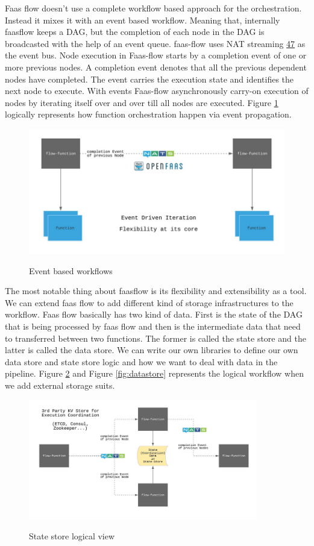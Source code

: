 \documentclass[12pt,titlepage]{article}
\begin{document}
Faas flow doesn't use a complete workflow based approach for the orchestration.
Instead it mixes it with an event based workflow. Meaning that, internally
faasflow keeps a DAG, but the completion of each node in the DAG is broadcasted
with the help of an event queue. faas-flow uses NAT streaming \hyperref[ref:47]{47} as the event
bus. Node execution in Faas-flow starts by a completion event of one or more
previous nodes. A completion event denotes that all the previous dependent nodes
have completed. The event carries the execution state and identifies the next
node to execute. With events Faas-flow asynchronously carry-on execution of
nodes by iterating itself over and over till all nodes are executed. Figure
\ref{fig:nat} logically represents how function orchestration happen via event
propagation. 

\begin{figure}[!h]
    \caption{Event based workflows}
    \centering
    \includegraphics[width=130mm]{./thesis_images/nat.png}
    \label{fig:nat}
\end{figure}

The most notable thing about faasflow is its flexibility and extensibility as a
tool. We can extend faas flow to add different kind of storage infrastructures
to the workflow. Faas flow basically has two kind of data. First is the state of
the DAG that is being processed by faas flow and then is the intermediate data
that need to transferred between two functions. The former is called the state
store and the latter is called the data store.  We can write our own libraries
to define our own data store and state store logic and how we want to deal with
data in the pipeline. Figure \ref{fig:statestore} and Figure \ref{fig:datastore}
represents the logical workflow when we add external storage suits.

\begin{figure}[!h]
    \caption{State store logical view}
    \centering
    \includegraphics[width=100mm]{./thesis_images/statestore.png}
    \label{fig:statestore}
\end{figure}
\end{document}
